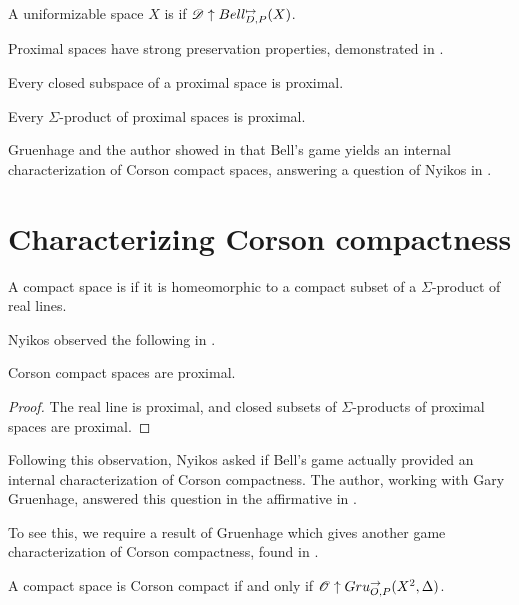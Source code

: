 \begin{defn}
  A uniformizable space $X$ is  if
  $\mathscr{D} \uparrow Bell_{D,P}^{\mapsto}(X)$.
\end{defn}

Proximal spaces have strong preservation properties, demonstrated in
\cite{MR3239205}.

\begin{thm}
  Every closed subspace of a proximal space is proximal.
\end{thm}

\begin{thm}
  Every $\Sigma$-product of proximal spaces is proximal.
\end{thm}

Gruenhage and the author showed in \cite{MR3227201} that Bell's game
yields an internal characterization of Corson compact spaces, answering
a question of Nyikos in \cite{nyikosProximalPreprint}.



\section{Characterizing Corson compactness}

\begin{defn}
  A compact space is  if it is homeomorphic to a compact
  subset of a $\Sigma$-product of real lines.
\end{defn}

Nyikos observed the following in \cite{nyikosProximalPreprint}.

\begin{prop}
  Corson compact spaces are proximal.
\end{prop}

\begin{proof}
  The real line is proximal, and closed subsets of $\Sigma$-products of proximal
  spaces are proximal.
\end{proof}

Following this observation, Nyikos asked if Bell's game actually provided an
internal characterization of Corson compactness. The author, working with
Gary Gruenhage, answered this question in the affirmative in \cite{MR3227201}.

To see this, we require a result of Gruenhage which gives another game
characterization of Corson compactness, found in \cite{MR752278}.

\begin{thm}
  A compact space is Corson compact if and only if
  $\mathscr{O} \uparrow Gru_{O,P}^{\to}(X^2,\Delta)$.
\end{thm}

